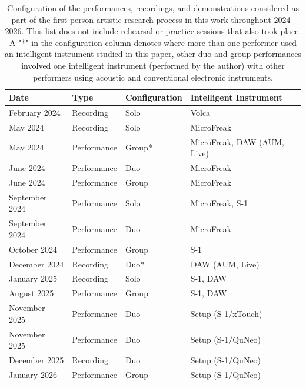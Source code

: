 \documentclass[sigconf]{nimeart}
\begin{document}
\begin{table}[t]
\caption{Configuration of the performances, recordings, and demonstrations considered as part of the first-person artistic research process in this work throughout 2024--2026. This list does not include rehearsal or practice sessions that also took place.
A "*" in the configuration column denotes where more than one performer used an intelligent instrument studied in this paper, other duo and group performances involved one intelligent instrument (performed by the author) with other performers using acoustic and conventional electronic instruments.}
\label{tab:perf-corpus}
\begin{tabular}{@{}llll@{}}
Date           & Type           & Configuration & Intelligent Instrument      \\ \midrule
February 2024  & Recording      & Solo          & Volca                       \\
May 2024       & Recording      & Solo          & MicroFreak                  \\
May 2024       & Performance    & Group*        & MicroFreak, DAW (AUM, Live) \\
June 2024      & Performance    & Duo           & MicroFreak                  \\
June 2024      & Performance    & Group         & MicroFreak                  \\
September 2024 & Performance    & Solo          & MicroFreak, S-1             \\
September 2024 & Performance    & Duo           & MicroFreak                  \\
October 2024   & Performance    & Group         & S-1                         \\
December 2024  & Recording      & Duo*          & DAW (AUM, Live)             \\
January 2025   & Recording      & Solo          & S-1, DAW                    \\
August 2025    & Performance    & Group         & S-1, DAW                    \\
November 2025  & Performance    & Duo           & Setup (S-1/xTouch)          \\
November 2025  & Performance    & Duo           & Setup (S-1/QuNeo)           \\
December 2025  & Recording      & Duo           & Setup (S-1/QuNeo)           \\
January 2026   & Performance    & Group         & Setup (S-1/QuNeo)           \\
\end{tabular}
\end{table}
\end{document}
